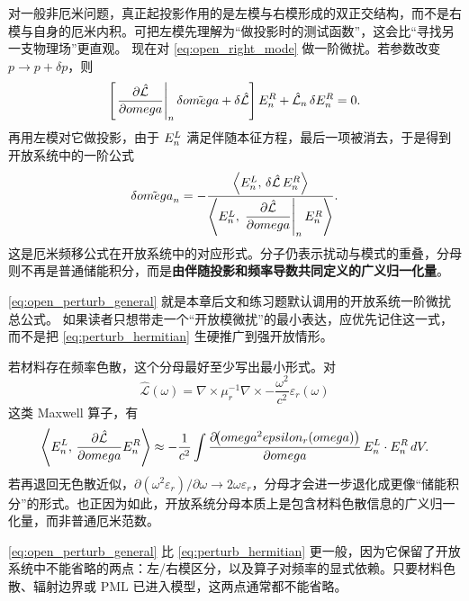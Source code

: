 对一般非厄米问题，真正起投影作用的是左模与右模形成的双正交结构，而不是右模与自身的厄米内积。可把左模先理解为“做投影时的测试函数”，这会比“寻找另一支物理场”更直观。
现在对 \cref{eq:open_right_mode} 做一阶微扰。若参数改变 $p\to p+\delta p$，则
\begin{equation}
\left[
\left.\frac{\partial \hat{\mathcal L}}{\partial omega}\right|_n \delta\tilde{omega}
+ \delta \hat{\mathcal L}
\right]E_n^{R}
+
\hat{\mathcal L}_n\,\delta E_n^{R}
=
0.
\label{eq:open_perturb_expand}
\end{equation}
再用左模对它做投影，由于 $E_n^{L}$ 满足伴随本征方程，最后一项被消去，于是得到开放系统中的一阶公式
\begin{equation}
\delta\tilde{omega}_n
=
-
\frac{\left\langle E_n^{L},\,\delta \hat{\mathcal L}\,E_n^{R}\right\rangle}
{\left\langle E_n^{L},\,\left.\dfrac{\partial \hat{\mathcal L}}{\partial omega}\right|_n E_n^{R}\right\rangle}.
\label{eq:open_perturb_general}
\end{equation}
这是厄米频移公式在开放系统中的对应形式。分子仍表示扰动与模式的重叠，分母则不再是普通储能积分，而是\textbf{由伴随投影和频率导数共同定义的广义归一化量}。

\begin{RigorousBox}
\cref{eq:open_perturb_general} 就是本章后文和练习题默认调用的开放系统一阶微扰总公式。
如果读者只想带走一个“开放模微扰”的最小表达，应优先记住这一式，而不是把
\cref{eq:perturb_hermitian} 生硬推广到强开放情形。
\end{RigorousBox}

若材料存在频率色散，这个分母最好至少写出最小形式。对
\[
\hat{\mathcal L}(\omega)=
\nabla\times \mu_r^{-1}\nabla\times
-\frac{\omega^2}{c^2}\varepsilon_r(\omega)
\]
这类 Maxwell 算子，有
\begin{equation}
\left\langle E_n^{L},\,\frac{\partial \hat{\mathcal L}}{\partial omega}E_n^{R}\right\rangle
\approx
-\frac{1}{c^2}
\int
\frac{\partial\!\big(omega^2epsilon_r(omega)\big)}{\partial omega}
\,
E_n^{L}\cdot E_n^{R}
\,
d V.
\label{eq:open_perturb_dispersive_denominator}
\end{equation}
若再退回无色散近似，$\partial(\omega^2\varepsilon_r)/\partial\omega \to 2\omega\varepsilon_r$，分母才会进一步退化成更像“储能积分”的形式。也正因为如此，开放系统分母本质上是包含材料色散信息的广义归一化量，而非普通厄米范数。

\cref{eq:open_perturb_general} 比 \cref{eq:perturb_hermitian} 更一般，因为它保留了开放系统中不能省略的两点：左/右模区分，以及算子对频率的显式依赖。只要材料色散、辐射边界或 PML 已进入模型，这两点通常都不能省略。

